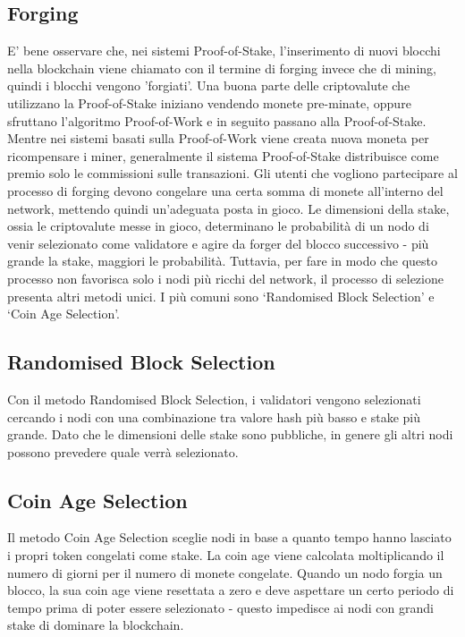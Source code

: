 \subsection{Forging}
E’ bene osservare che, nei sistemi Proof-of-Stake, l’inserimento di nuovi blocchi nella blockchain viene chiamato con il termine di forging invece che di mining, quindi i blocchi vengono 'forgiati'. Una buona parte delle criptovalute che utilizzano la Proof-of-Stake iniziano vendendo monete pre-minate, oppure sfruttano l’algoritmo Proof-of-Work e in seguito passano alla Proof-of-Stake.
Mentre nei sistemi basati sulla Proof-of-Work viene creata nuova moneta per ricompensare i miner, generalmente il sistema Proof-of-Stake distribuisce come premio solo le commissioni sulle transazioni.
Gli utenti che vogliono partecipare al processo di forging devono congelare una certa somma di monete all’interno del network, mettendo quindi un’adeguata posta in gioco. Le dimensioni della stake, ossia le criptovalute messe in gioco, determinano le probabilità di un nodo di venir selezionato come validatore e agire da forger del blocco successivo - più grande la stake, maggiori le probabilità. Tuttavia, per fare in modo che questo processo non favorisca solo i nodi più ricchi del network, il processo di selezione presenta altri metodi unici. I più comuni sono ‘Randomised Block Selection’ e ‘Coin Age Selection’.
\newpage
\subsection{Randomised Block Selection}
Con il metodo Randomised Block Selection, i validatori vengono selezionati cercando i nodi con una combinazione tra valore hash più basso e stake più grande. Dato che le dimensioni delle stake sono pubbliche, in genere gli altri nodi possono prevedere quale verrà selezionato.
\subsection{Coin Age Selection}
Il metodo Coin Age Selection sceglie nodi in base a quanto tempo hanno lasciato i propri token congelati come stake. La coin age viene calcolata moltiplicando il numero di giorni per il numero di monete congelate. Quando un nodo forgia un blocco, la sua coin age viene resettata a zero e deve aspettare un certo periodo di tempo prima di poter essere selezionato - questo impedisce ai nodi con grandi stake di dominare la blockchain.
